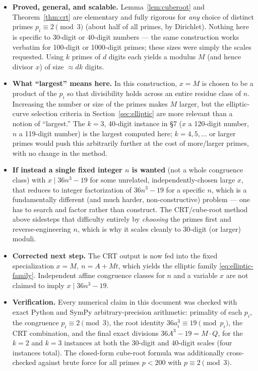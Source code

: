 \documentclass[11pt]{article}
\begin{document}
\begin{itemize}
\item \textbf{Proved, general, and scalable.} Lemma~\ref{lem:cuberoot} and
Theorem~\ref{thm:crt} are elementary and fully rigorous for \emph{any} choice
of distinct primes $p_i\equiv 2\pmod 3$ (about half of all primes, by
Dirichlet). Nothing here is specific to 30-digit or 40-digit numbers --- the
same construction works verbatim for 100-digit or 1000-digit primes; these
sizes were simply the scales requested. Using $k$ primes of $d$ digits each
yields a modulus $M$ (and hence divisor $x$) of size $\approx dk$ digits.
\item \textbf{What ``largest'' means here.} In this construction, $x=M$ is chosen to be a product of the $p_i$ so that
divisibility holds across an entire residue class of $n$.  Increasing the
number or size of the primes makes $M$ larger, but the elliptic-curve
selection criteria in Section~\ref{sec:elliptic} are more relevant than a
notion of ``largest.'' The $k=3$, 40-digit instance in
\S7 ($x$ a 120-digit number, $n$ a 119-digit number) is the largest computed
here; $k=4,5,\dots$ or larger primes would push this arbitrarily further at
the cost of more/larger primes, with no change in the method.
\item \textbf{If instead a single fixed integer $n$ is wanted} (not a whole
congruence class) with $x\mid 36n^3-19$ for some unrelated, independently-chosen
large $x$, that reduces to integer factorization of $36n^3-19$ for a specific
$n$, which is a fundamentally different (and much harder, non-constructive)
problem --- one has to search and factor rather than construct. The
CRT/cube-root method above sidesteps that difficulty entirely by
\emph{choosing} the primes first and reverse-engineering $n$, which is why it
scales cleanly to 30-digit (or larger) moduli.
\item \textbf{Corrected next step.}  The CRT output is now fed into the fixed
specialization \(x=M,\ n=A+Mt\), which yields the elliptic family
\eqref{eq:elliptic-family}.  Independent affine congruence classes for \(n\)
and a variable \(x\) are not claimed to imply \(x\mid36n^3-19\).
\enlargethispage{3\baselineskip}
\item \textbf{Verification.} Every numerical claim in this document was
checked with exact Python and SymPy arbitrary-precision arithmetic: primality of
each $p_i$, the congruence $p_i\equiv 2\pmod 3$, the root identity
$36a_i^3\equiv 19\pmod{p_i}$, the CRT combination, and the final exact
divisions $36A^3-19 = M\cdot Q$, for the $k=2$ and $k=3$ instances at both the
30-digit and 40-digit scales (four instances total). The closed-form
cube-root formula was additionally cross-checked against brute force for all
primes $p<200$ with $p\equiv2\pmod3$.
\end{itemize}
\end{document}

